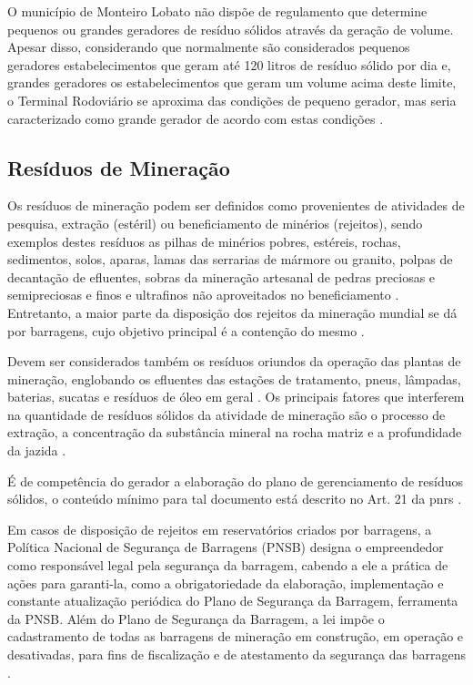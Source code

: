 	O município de Monteiro Lobato não dispõe de regulamento que determine pequenos ou grandes geradores de resíduo sólidos através da geração de volume. Apesar disso, considerando que normalmente são considerados pequenos geradores estabelecimentos que geram até 120 litros de resíduo sólido por dia e, grandes geradores os estabelecimentos que geram um volume acima deste limite, o Terminal Rodoviário se aproxima das condições de pequeno gerador, mas seria caracterizado como grande gerador de acordo com estas condições \cite{ibam:2001}.
	
	
	\subsection{Resíduos de Mineração}
	Os resíduos de mineração podem ser definidos como provenientes de atividades de pesquisa, extração (estéril) ou beneficiamento de minérios (rejeitos), sendo exemplos destes resíduos as pilhas de minérios pobres, estéreis, rochas, sedimentos, solos, aparas, lamas das serrarias de mármore ou granito, polpas de decantação de efluentes, sobras da mineração artesanal de pedras preciosas e semipreciosas e finos e ultrafinos não aproveitados no beneficiamento \cite{IBRAM2016}. Entretanto, a maior parte da disposição dos rejeitos da mineração mundial se dá por barragens, cujo objetivo principal é a contenção do mesmo \cite{MME:2017, IBRAM2016}.
	
	Devem ser considerados também os resíduos oriundos da operação das plantas de mineração, englobando os efluentes das estações de tratamento, pneus, lâmpadas, baterias, sucatas e resíduos de óleo em geral \cite{IBRAM2016}. Os principais fatores que interferem na quantidade de resíduos sólidos da atividade de mineração são o processo de extração, a concentração da substância mineral na rocha matriz e a profundidade da jazida \cite{IPEA2012c}.
	
	É de competência do gerador a elaboração do plano de gerenciamento de resíduos sólidos, o conteúdo mínimo para tal documento está descrito no Art. 21 da \gls{pnrs} \cite{brasil:12305}.
	
	Em casos de disposição de rejeitos em reservatórios criados por barragens, a Política Nacional de Segurança de Barragens (PNSB) designa o empreendedor como responsável legal pela segurança da barragem, cabendo a ele a prática de ações para garanti-la, como a obrigatoriedade da elaboração, implementação e constante atualização periódica do Plano de Segurança da Barragem, ferramenta da PNSB. Além do Plano de Segurança da Barragem, a lei impõe o cadastramento de todas as barragens de mineração em construção, em operação e desativadas, para fins de fiscalização e de atestamento da segurança das barragens \cite{brasil:12334}.

